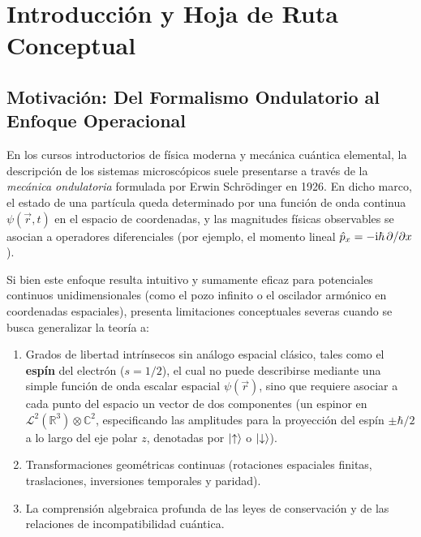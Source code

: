 
\section{Introducción y Hoja de Ruta Conceptual}
\label{sec:introduccion}

\subsection{Motivación: Del Formalismo Ondulatorio al Enfoque Operacional}

En los cursos introductorios de física moderna y mecánica cuántica elemental, la descripción de los sistemas microscópicos suele presentarse a través de la \textit{mecánica ondulatoria} formulada por Erwin Schrödinger en 1926. En dicho marco, el estado de una partícula queda determinado por una función de onda continua $\psi(\vec{r}, t)$ en el espacio de coordenadas, y las magnitudes físicas observables se asocian a operadores diferenciales (por ejemplo, el momento lineal $\hat{p}_x = -\mathrm{i}\hbar\,\partial/\partial x$).

Si bien este enfoque resulta intuitivo y sumamente eficaz para potenciales continuos unidimensionales (como el pozo infinito o el oscilador armónico en coordenadas espaciales), presenta limitaciones conceptuales severas cuando se busca generalizar la teoría a:
\begin{enumerate}
    \item Grados de libertad intrínsecos sin análogo espacial clásico, tales como el \textbf{espín} del electrón ($s = 1/2$), el cual no puede describirse mediante una simple función de onda escalar espacial $\psi(\vec{r})$, sino que requiere asociar a cada punto del espacio un vector de dos componentes (un espinor en $\mathcal{L}^2(\mathbb{R}^3) \otimes \mathbb{C}^2$, especificando las amplitudes para la proyección del espín $\pm\hbar/2$ a lo largo del eje polar $z$, denotadas por $\left| \uparrow \right\rangle$ o $\left| \downarrow \right\rangle$).
    \item Transformaciones geométricas continuas (rotaciones espaciales finitas, traslaciones, inversiones temporales y paridad).
    \item La comprensión algebraica profunda de las leyes de conservación y de las relaciones de incompatibilidad cuántica.
\end{enumerate}

